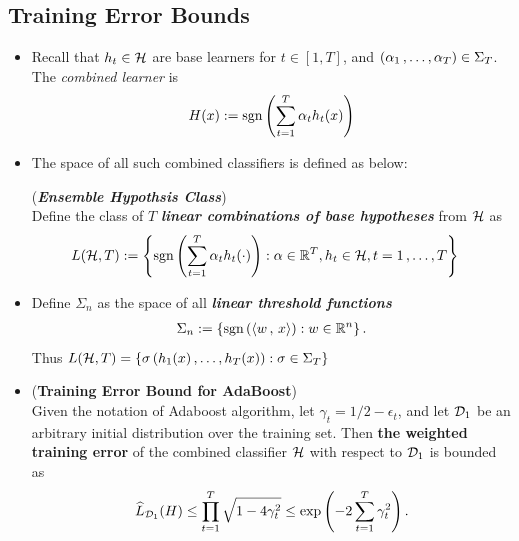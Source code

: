 \documentclass[11pt]{article}
\begin{document}
\subsection{Training Error Bounds}
\begin{itemize}
\item \begin{remark}
Recall that $h_t \in {\mathcal H}$ are base learners for $t \in [1,T]$, and $(\alpha_1 \,{,}\ldots{,}\, \alpha_{T}) \in \Sigma_{T}$. The \emph{combined learner} is
\begin{align*}
H(x) := \text{sgn}\left(\sum_{t=1}^{T}\alpha_t h_t(x)\right)
\end{align*}
\end{remark}

\item The space of all such combined classifiers is defined as below:
\begin{definition}(\textbf{\emph{Ensemble Hypothsis Class}})\\
Define the class of $T$ \emph{\textbf{linear combinations of base hypotheses}} from ${\mathcal H}$ as
\begin{align}
L({\mathcal H}, T) &:=  \left\{\text{sgn}\left(\sum_{t=1}^{T}\alpha_t h_t(\cdot )\right):  \alpha \in {\mathbb R}^{T},  h_t \in {\mathcal H},  t = 1\,{,}\ldots{,}\, T \right\}  \label{def: linear_ensemble_class}
\end{align}
\end{definition}

\item \begin{definition}
Define $\Sigma_n$  as the space of all \textbf{\emph{linear threshold functions}}
\begin{align*}
\Sigma_n := \left\{\text{sgn}\left(\left\langle w\,,\, x \right\rangle\right):  w \in {\mathbb R}^n\right\}.
\end{align*} Thus $L({\mathcal H}, T) = \left\{\sigma\left(h_1(x) \,{,}\ldots{,}\, h_{T}(x)\right) : \sigma \in \Sigma_{T}\right\}$
\end{definition}



\item \begin{proposition} (\textbf{Training Error Bound for AdaBoost}) \citep{schapire2012boosting}\\
Given the notation of Adaboost algorithm, let $\gamma_t = 1/2 - \epsilon_t$, and let ${\mathcal D}_1$ be an arbitrary initial distribution over the training set. Then \textbf{the weighted training error} of the combined classifier ${\mathcal H}$ with respect to ${\mathcal D}_1$ is bounded as
\begin{align}
\widehat{L}_{{\mathcal D}_1}(H) \le \prod_{t=1}^{T} \sqrt{1 - 4 \gamma_t^2} \le \exp\left(- 2 \sum_{t=1}^{T}\gamma_t^2\right). \label{ineqn: boosting_training_error_bound}
\end{align} 
\end{proposition}
\end{itemize}
\end{document}
